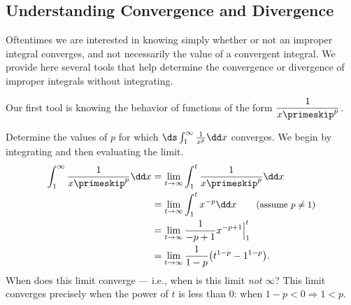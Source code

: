 \subsection{Understanding Convergence and Divergence}

Oftentimes we are interested in knowing simply whether or not an improper integral converges, and not necessarily the value of a convergent integral. We provide here several tools that help determine the convergence or divergence of improper integrals without integrating.

Our first tool is knowing the behavior of functions of the form $\dfrac1{x\primeskip^p}$.

\begin{example}\label{ex_impint4}%
Determine the values of $p$ for which $\ds \int_1^\infty \frac1{x^p}\dd x$ converges.
\solution
We begin by integrating and then evaluating the limit.
\begin{align*}
	\int_1^\infty \frac1{x\primeskip^p}\dd x
	&= \lim_{t\to\infty}\int_1^t\frac1{x\primeskip^p}\dd x\\
	&= \lim_{t\to\infty}\int_1^t x^{-p}\dd x \qquad \text{\small (assume $p\neq 1$)}\\
	&= \lim_{t\to\infty} \frac{1}{-p+1}x^{-p+1}\Big|_1^t\\
	&= \lim_{t\to\infty} \frac{1}{1-p}\bigl(t^{1-p}-1^{1-p}\bigr).\\
\end{align*}
%
%
%
When does this limit converge --- i.e., when is this limit \emph{not} $\infty$? This limit converges precisely when the power of $t$ is less than 0: when $1-p<0 \Rightarrow 1<p$. 


\end{example}
